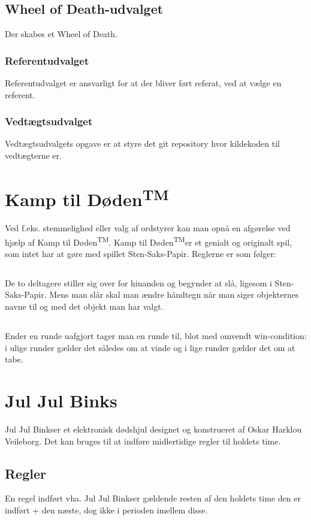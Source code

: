 \documentclass{article}
\newcommand{\KTD}{Kamp til Døden\textsuperscript{TM}}
\newcommand{\JJB}{Jul Jul Binks}
\begin{document}
	\subsection{Wheel of Death-udvalget}
	Der skabes et Wheel of Death.
	\subsubsection{Referentudvalget}
	Referentudvalget er ansvarligt for at der bliver ført referat, ved at vælge en referent.
	\subsubsection{Vedtægtsudvalget}
	Vedtægtsudvalgets opgave er at styre det git repository hvor kildekoden til vedtægterne er.


	\section{\KTD}
	Ved f.eks. stemmelighed eller valg af ordstyrer kan man opnå en afgørelse ved hjælp af \KTD. \KTD er et genialt og originalt spil, som intet har at gøre med spillet Sten-Saks-Papir. Reglerne er som følger:
	\subsection{}
	De to deltagere stiller sig over for hinanden og begynder at slå, ligesom i Sten-Saks-Papir. Mens man slår skal man ændre håndtegn når man siger objekternes navne til og med det objekt man har valgt.
	\subsection{}
	Ender en runde uafgjort tager man en runde til, blot med omvendt win-condition: i ulige runder gælder det således om at vinde og i lige runder gælder det om at tabe.

	\section{\JJB}
	\JJB er et elektronisk dødshjul designet og konstrueret af Oskar Harklou Veileborg. Det kan bruges til at indføre midlertidige regler til holdets time.
	\subsection{Regler}
	En regel indført vha. \JJB er gældende resten af den holdets time den er indført + den næste, dog ikke i perioden imellem disse.
\end{document}
